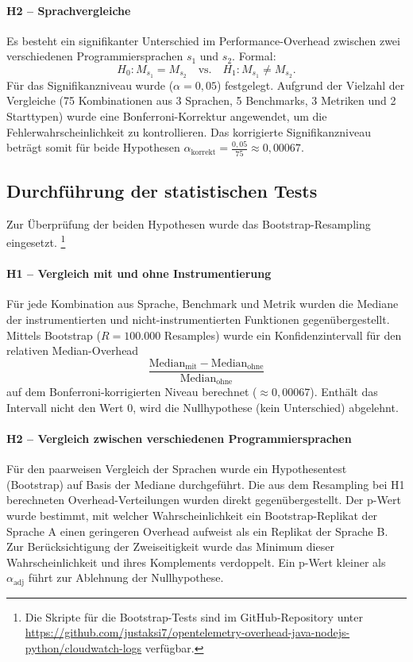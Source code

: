 \paragraph{H2 – Sprachvergleiche}
Es besteht ein signifikanter Unterschied im Performance-Overhead zwischen zwei verschiedenen Programmiersprachen \(s_1\) und \(s_2\). Formal:
\[
H_0: M_{s_1} = M_{s_2} \quad \text{vs.} \quad H_1: M_{s_1} \neq M_{s_2}.
\]
Für das Signifikanzniveau wurde (\(\alpha = 0{,}05\)) festgelegt. Aufgrund der Vielzahl der 
Vergleiche (75 Kombinationen aus 3 Sprachen, 5 Benchmarks, 3 Metriken und 2 Starttypen) wurde eine 
Bonferroni-Korrektur angewendet, um die Fehlerwahrscheinlichkeit zu kontrollieren. 
Das korrigierte Signifikanzniveau beträgt somit für beide Hypothesen \(\alpha_{\text{korrekt}} = \frac{0{,}05}{75} \approx 0{,}00067\).

\subsection{Durchführung der statistischen Tests}
Zur Überprüfung der beiden Hypothesen wurde das Bootstrap-Resampling~\cite{efron1994introduction} eingesetzt. 
\footnote{Die Skripte für die Bootstrap-Tests sind im GitHub-Repository unter \url{https://github.com/justaksi7/opentelemetry-overhead-java-nodejs-python/cloudwatch-logs} verfügbar.}
\paragraph{H1 – Vergleich mit und ohne Instrumentierung}
Für jede Kombination aus Sprache, Benchmark und Metrik wurden die Mediane der instrumentierten und nicht-instrumentierten Funktionen gegenübergestellt. Mittels Bootstrap (\(R = 100.000\) Resamples) wurde ein Konfidenzintervall für den relativen Median-Overhead 
\[
\frac{\text{Median}_{\text{mit}} - \text{Median}_{\text{ohne}}}{\text{Median}_{\text{ohne}}}
\]
auf dem Bonferroni-korrigierten Niveau berechnet (\(\approx 0{,}00067\)). Enthält das Intervall nicht den Wert 0, wird die Nullhypothese (kein Unterschied) abgelehnt.

\paragraph{H2 – Vergleich zwischen verschiedenen Programmiersprachen}
Für den paarweisen Vergleich der Sprachen wurde ein Hypothesentest (Bootstrap)
auf Basis der Mediane durchgeführt. Die aus dem Resampling bei H1 berechneten 
Overhead-Verteilungen wurden direkt gegenübergestellt. 
Der p-Wert wurde bestimmt, mit welcher Wahrscheinlichkeit ein Bootstrap-Replikat der 
Sprache A einen geringeren Overhead aufweist als ein Replikat der Sprache B. 
Zur Berücksichtigung der Zweiseitigkeit wurde das Minimum dieser Wahrscheinlichkeit 
und ihres Komplements verdoppelt. Ein p-Wert kleiner als \(\alpha_{\text{adj}}\) 
führt zur Ablehnung der Nullhypothese.

